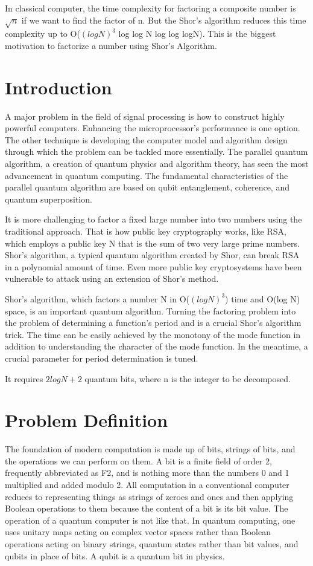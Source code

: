 \documentclass{article}
\begin{document}
    In classical computer, the time complexity for factoring a composite number is $\sqrt{n}$ if we want to find the factor of n. But the Shor's algorithm reduces this time complexity up to O($(log N)^3$ log log N log log logN). This is the biggest motivation to factorize a number using Shor's Algorithm.

\newpage
\tableofcontents

\newpage
\section{Introduction}
A major problem in the field of signal processing is how to construct highly powerful computers. Enhancing the microprocessor's performance is one option. The other technique is developing the computer model and algorithm design through which the problem can be tackled more essentially. The parallel quantum algorithm, a creation of quantum physics and algorithm theory, has seen the most advancement in quantum computing. The fundamental characteristics of the parallel quantum algorithm are based on qubit entanglement, coherence, and quantum superposition.

It is more challenging to factor a fixed large number into two numbers using the traditional approach. That is how public key cryptography works, like RSA, which employs a public key N that is the sum of two very large prime numbers. Shor's algorithm, a typical quantum algorithm created by Shor, can break RSA in a polynomial amount of time. Even more public key cryptosystems have been vulnerable to attack using an extension of Shor's method.

Shor's algorithm, which factors a number N in O($(log N)^3$) time and O(log N) space, is an important quantum algorithm. Turning the factoring problem into the problem of determining a function's period and is a crucial Shor's algorithm trick. The time can be easily achieved by the monotony of the mode function in addition to understanding the character of the mode function. In the meantime, a crucial parameter for period determination is tuned.

It requires $2logN + 2$ quantum bits, where n is the integer to be decomposed.

\section{Problem Definition}

The foundation of modern computation is made up of bits, strings of bits, and the operations we can perform on them.
A bit is a finite field of order 2, frequently abbreviated as F2, and is nothing more than the numbers 0 and 1 multiplied and added modulo 2.
All computation in a conventional computer reduces to representing things as strings of zeroes and ones and then applying Boolean operations to them because the content of a bit is its bit value.
The operation of a quantum computer is not like that.
In quantum computing, one uses unitary maps acting on complex vector spaces rather than Boolean operations acting on binary strings, quantum states rather than bit values, and qubits in place of bits.
A qubit is a quantum bit in physics.
\end{document}
